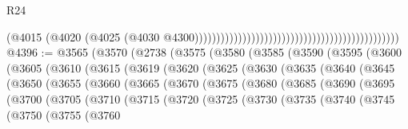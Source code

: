 \begin{lexlean}{R24}
\begin{coremodule}
{{{{{{{{{{{{{{{{{{{{{{{{{{{{{{{{{{{{{{{{{{{{{{{{{{{{{{{{{{{{{{{{{{{{{{{{{{{{{{{{{{{{{{{{{{{{{{{{{{{{{{{{{{{{{{{{{{{{{{{{{{{{{{{{{{{{{{{{{{{{{{{{{{{{{{{{{{{{{{{{{{{{{{{{{{{{{{{{{{{{{{{{{{{{{{{{{{{                                                                                          (@4015
                                                                                            (@4020
                                                                                              (@4025
                                                                                                (@4030
                                                                                                  @4300)))))))))))))))))))))))))))))))))))))))))))))))
@4396 := @3565
    (@3570
      (@2738
        (@3575
          (@3580
            (@3585
              (@3590
                (@3595
                  (@3600
                    (@3605
                      (@3610
                        (@3615
                          (@3619
                            (@3620
                              (@3625
                                (@3630
                                  (@3635
                                    (@3640
                                      (@3645
                                        (@3650
                                          (@3655
                                            (@3660
                                              (@3665
                                                (@3670
                                                  (@3675
                                                    (@3680
                                                      (@3685
                                                        (@3690
                                                          (@3695
                                                            (@3700
                                                              (@3705
                                                                (@3710
                                                                  (@3715
                                                                    (@3720
                                                                      (@3725
                                                                        (@3730
                                                                          (@3735
                                                                            (@3740
                                                                              (@3745
                                                                                (@3750
                                                                                  (@3755
                                                                                    (@3760
}}}}}}}}}}}}}}}}}}}}}}}}}}}}}}}}}}}}}}}}}}}}}}}}}}}}}}}}}}}}}}}}}}}}}}}}}}}}}}}}}}}}}}}}}}}}}}}}}}}}}}}}}}}}}}}}}}}}}}}}}}}}}}}}}}}}}}}}}}}}}}}}}}}}}}}}}}}}}}}}}}}}}}}}}}}}}}}}}}}}}}}}}}}}}}}}}}}
\end{coremodule}
\end{lexlean}
